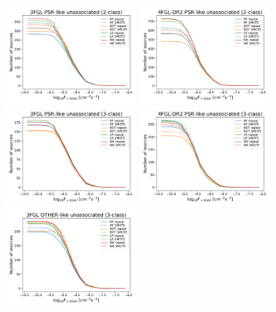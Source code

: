 \documentclass[referee]{aa} %
\begin{document}
\begin{appendix}
\begin{figure}[h]
\centering
\includegraphics[width=0.45\textwidth]{plots/oversample/N_logS_3FGL_PSR_2classes_O_vs_S.pdf}
\includegraphics[width=0.45\textwidth]{plots/oversample/N_logS_4FGL-DR2_PSR_2classes_O_vs_S.pdf}\\
\includegraphics[width=0.45\textwidth]{plots/oversample/N_logS_3FGL_PSR_3classes_O_vs_S.pdf}
\includegraphics[width=0.45\textwidth]{plots/oversample/N_logS_4FGL-DR2_PSR_3classes_O_vs_S.pdf}\\
\includegraphics[width=0.45\textwidth]{plots/oversample/N_logS_3FGL_OTHER_3classes_O_vs_S.pdf}

\end{figure}
\end{appendix}
\end{document}
